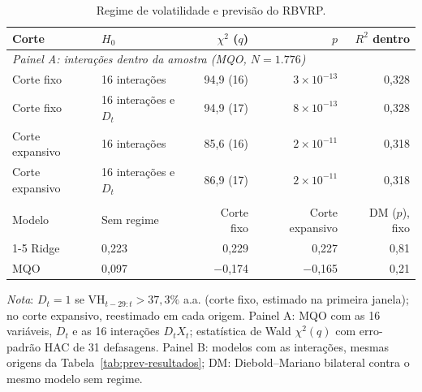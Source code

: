 \begin{table}[H]
\centering
\small
\caption{Regime de volatilidade e previsão do RBVRP.}
\label{tab:prev-regime}
\begin{tabular}{llrrr}
\toprule
Corte & $H_0$ & $\chi^2$ ($q$) & $p$ & $R^2$ dentro \\
\midrule
\multicolumn{5}{l}{\textit{Painel A: interações dentro da amostra (MQO, $N = 1.776$)}} \\
Corte fixo & 16 interações & 94{,}9 (16) & $3 \times 10^{-13}$ & 0{,}328 \\
Corte fixo & 16 interações e $D_t$ & 94{,}9 (17) & $8 \times 10^{-13}$ & 0{,}328 \\
Corte expansivo & 16 interações & 85{,}6 (16) & $2 \times 10^{-11}$ & 0{,}318 \\
Corte expansivo & 16 interações e $D_t$ & 86{,}9 (17) & $2 \times 10^{-11}$ & 0{,}318 \\
\addlinespace
\multicolumn{5}{l}{\textit{Painel B: previsão fora da amostra ($R^2_{\text{fora}}$, janela expansiva)}} \\
Modelo & Sem regime & Corte fixo & Corte expansivo & DM ($p$), fixo \\
\cmidrule(lr){1-5}
Ridge & 0{,}223 & 0{,}229 & 0{,}227 & 0{,}81 \\
MQO & 0{,}097 & $-$0{,}174 & $-$0{,}165 & 0{,}21 \\
\bottomrule
\end{tabular}
\par\smallskip
\parbox{0.95\linewidth}{\footnotesize\textit{Nota}: $D_t = 1$ se $\text{VH}_{t-29:t} > 37{,}3\%$ a.a. (corte fixo, estimado na primeira janela); no corte expansivo, reestimado em cada origem. Painel A: MQO com as 16 variáveis, $D_t$ e as 16 interações $D_t X_t$; estatística de Wald $\chi^2(q)$ com erro-padrão HAC de 31 defasagens. Painel B: modelos com as interações, mesmas origens da Tabela~\ref{tab:prev-resultados}; DM: Diebold--Mariano bilateral contra o mesmo modelo sem regime.}
\end{table}
